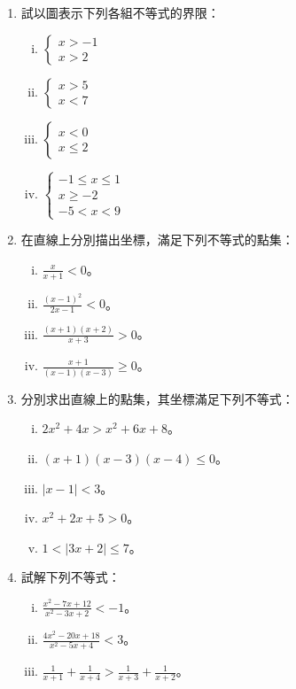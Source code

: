 \begin{enumerate}
    \item 試以圖表示下列各組不等式的界限：
    \begin{enumerate}[(i)]
        \item $\begin{cases} x>-1 \\ x>2 \end{cases}$
        \item $\begin{cases} x>5 \\ x<7 \end{cases}$
        \item $\begin{cases} x<0 \\ x\le 2 \end{cases}$
        \item $\begin{cases} -1\le x\le 1 \\ x\ge -2 \\ -5<x<9 \end{cases}$
    \end{enumerate}

    \item 在直線上分別描出坐標，滿足下列不等式的點集：
    \begin{enumerate}[(i)]
        \item $\frac{x}{x+1}<0$。
        \item $\frac{(x-1)^2}{2x-1}<0$。
        \item $\frac{(x+1)(x+2)}{x+3}>0$。
        \item $\frac{x+1}{(x-1)(x-3)}\ge 0$。
    \end{enumerate}

    \item 分別求出直線上的點集，其坐標滿足下列不等式：
    \begin{enumerate}[(i)]
        \item $2x^2+4x>x^2+6x+8$。
        \item $(x+1)(x-3)(x-4)\le 0$。
        \item $|x-1|<3$。
        \item $x^2+2x+5>0$。
        \item $1<|3x+2|\le 7$。
    \end{enumerate}

    \item 試解下列不等式：
    \begin{enumerate}[(i)]
        \item $\frac{x^2-7x+12}{x^2-3x+2} < -1$。
        \item $\frac{4x^2-20x+18}{x^2-5x+4} < 3$。
        \item $\frac{1}{x+1}+\frac{1}{x+4} > \frac{1}{x+3}+\frac{1}{x+2}$。
    \end{enumerate}


\end{enumerate}
